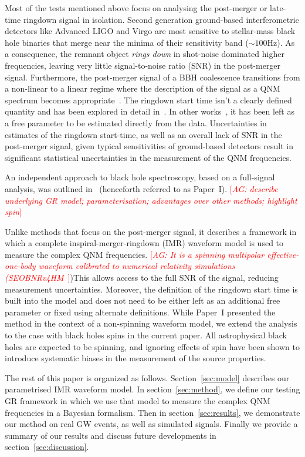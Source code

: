 \documentclass[twocolumn,prd,superscriptaddress,amsfonts,amssymb,amsmath,preprintnumbers]{revtex4-1}
\newcommand{\paperone}{Paper~I\xspace}
\newcommand{\abhi}[1]{\textcolor{red}{[\textit{AG: #1}]}}
\begin{document}
\par
Most of the tests mentioned above focus on analysing the post-merger or late-time ringdown signal in isolation. Second generation ground-based interferometric detectors like Advanced LIGO and Virgo are most sensitive to stellar-mass black hole binaries that merge near the minima of their sensitivity band ($\sim 100$Hz). As a consequence, the remnant object \textit{rings down} in shot-noise dominated higher frequencies, leaving very little signal-to-noise ratio (SNR) in the post-merger signal. Furthermore, the post-merger signal of a BBH coalescence transitions from a non-linear to a linear regime where the description of the signal as a QNM spectrum becomes appropriate~\citep{}. The ringdown start time isn't a clearly defined quantity and has been explored in detail in~\citep{Bhagwat:2017tkm}. In other works~\citep{Carullo:2018gah,Carullo:2019flw}, it has been left as a free parameter to be estimated directly from the data. Uncertainties in estimates of the ringdown start-time, as well as an overall lack of SNR in the post-merger signal, given typical sensitivities of ground-based detectors result in significant statistical uncertainties in the measurement of the QNM frequencies.
\par
An independent approach to black hole spectroscopy, based on a full-signal analysis, was outlined in~\citep{Brito:2018rfr} (henceforth referred to as \paperone). \abhi{describe underlying GR model; parameterisation; advantages over other methods; highlight spin} 



Unlike methods that focus on the post-merger signal, it describes a framework in which a complete inspiral-merger-ringdown (IMR) waveform model is used to measure the complex QNM frequencies. \abhi{It is a spinning multipolar effective-one-body waveform calibrated to numerical relativity simulations (SEOBNRv4HM~\citep{Cotesta:2018fcv}})This allows access to the full SNR of the signal, reducing measurement uncertainties. Moreover, the definition of the ringdown start time is built into the model and does not need to be either left as an additional free parameter or fixed using alternate definitions. While \paperone presented the method in the context of a non-spinning waveform model, we extend the analysis to the case with black holes spins in the current paper. All astrophysical black holes are expected to be spinning, and ignoring effects of spin have been shown to introduce systematic biases in the measurement of the source properties.
\par
The rest of this paper is organized as follows. Section~\ref{sec:model} describes our parametrised IMR waveform model. In section~\ref{sec:method}, we define our testing GR framework in which we use that model to measure the complex QNM frequencies in a Bayesian formalism. Then in section~\ref{sec:results}, we demonstrate our method on real GW events, as well as simulated signals. Finally we provide a summary of our results and discuss future developments in section~\ref{sec:discussion}.
\end{document}
